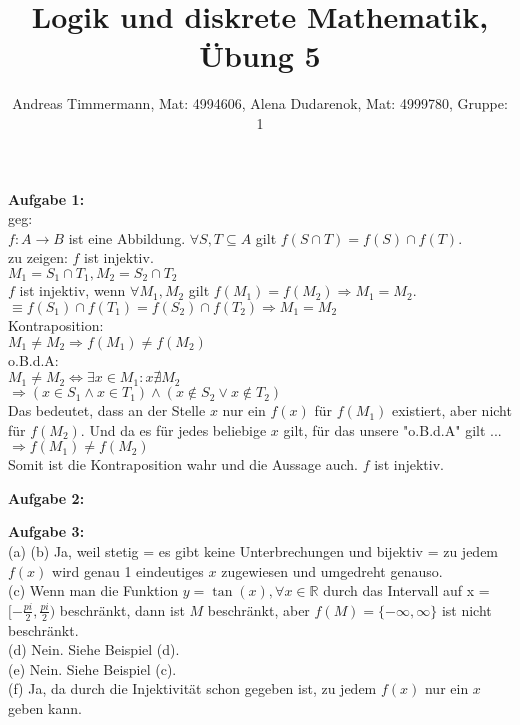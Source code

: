 \documentclass[a4paper]{scrartcl}
\title{Logik und diskrete Mathematik, Übung 5}
\author{Andreas Timmermann, Mat: 4994606, Alena Dudarenok, Mat: 4999780, Gruppe: 1}
\begin{document}
	\maketitle
	\begin{flushleft}
		\textbf{Aufgabe 1:}\\
		geg:\\
		$f:A\rightarrow B$ ist eine Abbildung. $\forall S,T\subseteq A$ gilt $f(S\cap T)=f(S)\cap f(T)$.\\
		zu zeigen: $f$ ist injektiv.\\[1em]
		$M_1 = S_1\cap T_1,M_2 = S_2\cap T_2$\\
		$f$ ist injektiv, wenn $\forall M_1,M_2$ gilt $f(M_1) = f(M_2)\Rightarrow M_1 = M_2$.\\ 
		$\equiv f(S_1)\cap f(T_1) = f(S_2)\cap f(T_2)\Rightarrow M_1 = M_2$\\[1em]
		Kontraposition:\\
		$M_1 \neq M_2 \Rightarrow f(M_1) \neq f(M_2)$\\
		o.B.d.A:\\
		$M_1 \neq M_2 \Leftrightarrow \exists x\in M_1: x\nexists M_2$\\
		$\Rightarrow (x\in S_1 \wedge x\in T_1) \wedge (x\notin S_2 \vee x\notin T_2)$\\
		Das bedeutet, dass an der Stelle $x$ nur ein $f(x)$ für $f(M_1)$ existiert, aber nicht für $f(M_2)$. Und da es für jedes beliebige $x$ gilt, für das unsere "o.B.d.A" gilt ...\\
		$\Rightarrow f(M_1)\neq f(M_2)$\\
		Somit ist die Kontraposition wahr und die Aussage auch. $f$ ist injektiv.
	\end{flushleft}
	\begin{flushleft}
		\textbf{Aufgabe 2:}\\
	\end{flushleft}
	\begin{flushleft}
		\textbf{Aufgabe 3:}\\		
		(a)
		(b) Ja, weil stetig = es gibt keine Unterbrechungen und bijektiv = zu jedem $f(x)$ wird genau 1 eindeutiges  $x$ zugewiesen und umgedreht genauso.\\
		(c) Wenn man die Funktion $y = \tan(x), \forall x\in \mathbb{R}$ durch das Intervall auf x = $[-\frac{pi}{2},\frac{pi}{2})$ beschränkt, dann ist $M$ beschränkt, aber $f(M)=\{-\infty,\infty\}$ ist nicht beschränkt.\\
		(d) Nein. Siehe Beispiel (d).\\  
		(e) Nein. Siehe Beispiel (c).\\  
		(f) Ja, da  durch die Injektivität schon gegeben ist, zu jedem $f(x)$ nur ein $x$ geben kann. 
	\end{flushleft}
\end{document}
